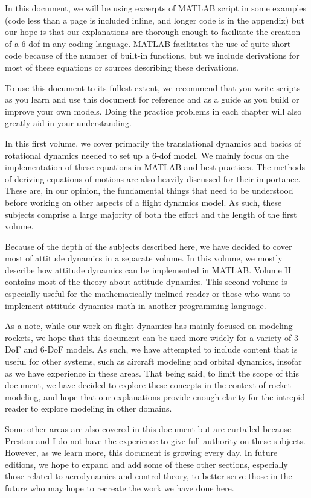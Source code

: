 \documentclass[12pt]{report}
\begin{document}
In this document, we will be using excerpts of MATLAB script in some examples (code less than a page is included inline, and longer code is in the appendix) but our hope is that our explanations are thorough enough to facilitate the creation of a 6-\gls{dof} in any coding language. MATLAB facilitates the use of quite short code because of the number of built-in functions, but we include derivations for most of these equations or sources describing these derivations.

To use this document to its fullest extent, we recommend that you write scripts as you learn and use this document for reference and as a guide as you build or improve your own models. Doing the practice problems in each chapter will also greatly aid in your understanding.

In this first volume, we cover primarily the translational dynamics and basics of rotational dynamics needed to set up a 6-\gls{dof} model. We mainly focus on the implementation of these equations in MATLAB and best practices. The methods of deriving equations of motions are also heavily discussed for their importance. These are, in our opinion, the fundamental things that need to be understood before working on other aspects of a flight dynamics model. As such, these subjects comprise a large majority of both the effort and the length of the first volume.

Because of the depth of the subjects described here, we have decided to cover most of attitude dynamics in a separate volume. In this volume, we mostly describe how attitude dynamics can be implemented in MATLAB. Volume II contains most of the theory about attitude dynamics. This second volume is especially useful for the mathematically inclined reader or those who want to implement attitude dynamics math in another programming language.

As a note, while our work on flight dynamics has mainly focused on modeling rockets, we hope that this document can be used more widely for a variety of 3-DoF and 6-DoF models. As such, we have attempted to include content that is useful for other systems, such as aircraft modeling and orbital dynamics, insofar as we have experience in these areas. That being said, to limit the scope of this document, we have decided to explore these concepts in the context of rocket modeling, and hope that our explanations provide enough clarity for the intrepid reader to explore modeling in other domains.

Some other areas are also covered in this document but are curtailed because Preston and I do not have the experience to give full authority on these subjects. However, as we learn more, this document is growing every day. In future editions, we hope to expand and add some of these other sections, especially those related to aerodynamics and control theory, to better serve those in the future who may hope to recreate the work we have done here.
\end{document}
